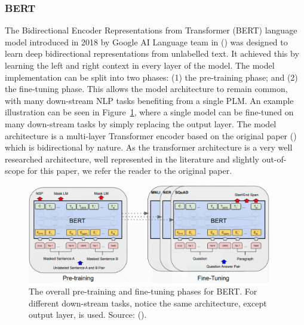 \documentclass[10pt,oneside]{report}
\begin{document}
\subsubsection{BERT}
The Bidirectional Encoder Representations from Transformer (BERT) language model introduced in 2018 by Google AI Language team in (\citet{devlin2019bert}) was designed to learn deep bidirectional representations from unlabelled text. It achieved this by learning the left and right context in every layer of the model. The model implementation can be split into two phases:  (1) the pre-training phase; and (2) the fine-tuning phase. This allows the model architecture to remain common, with many down-stream NLP tasks benefiting from a single PLM. An example illustration can be seen in Figure~\ref{fig:bert1}, where a single model can be fine-tuned on many down-stream tasks by simply replacing the output layer. The model architecture is a multi-layer Transformer encoder based on the original paper (\citet{vaswani2017attention}) which is bidirectional by nature. As the transformer architecture is a very well researched architecture, well represented in the literature and slightly out-of-scope for this paper, we refer the reader to the original paper.

\begin{figure}[htbp]
    \centering
    \includegraphics[width=0.95\textwidth]{BERT1.png}
    \caption{The overall pre-training and fine-tuning phases for BERT. For different down-stream tasks, notice the same architecture, except output layer, is used. Source: (\citet{devlin2019bert}).}\label{fig:bert1}
\end{figure}
\end{document}
